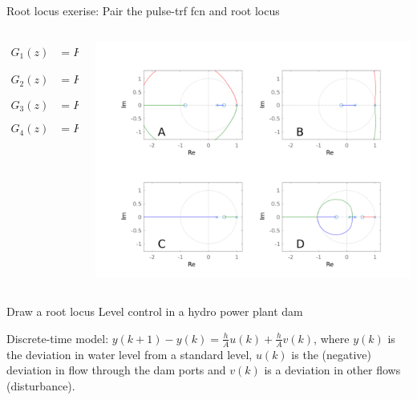 \documentclass[presentation,aspectratio=169]{beamer}
\begin{document}
\begin{frame}[label={sec:org7ea8274}]{Root locus exerise: Pair the pulse-trf fcn and root locus}
\begin{columns}
\begin{column}{0.35\columnwidth}
\begin{LaTeX}
\small
\begin{align*}
  G_1(z) &= K\frac{(z+2.9)(z+0.2)}{(z-1)^2(z-0.3)}\\[3mm]
  G_2(z) &= K\frac{(z-0.5)(z+0.4)}{(z-1)(z-0.3)(z-0.1)}\\[3mm]
  G_3(z) &= K\frac{(z-0.5)(z+0.8)}{(z-1)^2(z-0.3)}\\[3mm]
  G_4(z) &= K \frac{z-0.6}{(z-1)(z-0.3)}
\end{align*}
\end{LaTeX}
\end{column}

\begin{column}{0.65\columnwidth}
\begin{center}
\includegraphics[width=1.04\linewidth]{../../matlab/rlocus_2x2-crop}
\end{center}
\end{column}
\end{columns}
\end{frame}


\begin{frame}[label={sec:orgaba0adc}]{Draw a root locus}
Level control in a hydro power plant dam

\begin{center}
\small
\def\svgwidth{0.5\linewidth}

\end{center}

Discrete-time model: \(y(k+1) - y(k) = \frac{h}{A} u(k) + \frac{h}{A}v(k)\), where \(y(k)\) is the deviation in water level from a standard level, \(u(k)\) is the (negative) deviation in flow through the dam ports and \(v(k)\) is a deviation in other flows (disturbance). 
\end{frame}
\end{document}
